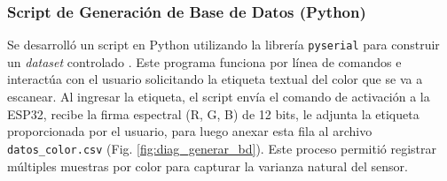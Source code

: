 \documentclass[conference]{IEEEtran}
\begin{document}
\subsubsection{Script de Generación de Base de Datos (Python)}
Se desarrolló un script en Python utilizando la librería \texttt{pyserial} para construir un \textit{dataset} controlado \cite{ldr_14}. Este programa funciona por línea de comandos e interactúa con el usuario solicitando la etiqueta textual del color que se va a escanear. Al ingresar la etiqueta, el script envía el comando de activación a la ESP32, recibe la firma espectral (R, G, B) de 12 bits, le adjunta la etiqueta proporcionada por el usuario, para luego anexar esta fila al archivo \texttt{datos\_color.csv} (Fig. \ref{fig:diag_generar_bd}). Este proceso permitió registrar múltiples muestras por color para capturar la varianza natural del sensor.
\end{document}
